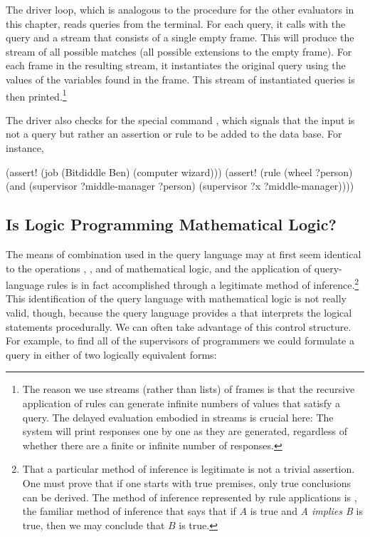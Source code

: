 The driver loop, which is analogous to the  procedure for the
other evaluators in this chapter, reads queries from the terminal.  For each
query, it calls  with the query and a stream that consists of a
single empty frame.  This will produce the stream of all possible matches (all
possible extensions to the empty frame).  For each frame in the resulting
stream, it instantiates the original query using the values of the variables
found in the frame.  This stream of instantiated queries is then
printed.\footnote{The reason we use streams (rather than lists) of frames is
that the recursive application of rules can generate infinite numbers of values
that satisfy a query.  The delayed evaluation embodied in streams is crucial
here: The system will print responses one by one as they are generated,
regardless of whether there are a finite or infinite number of responses.}

The driver also checks for the special command , which signals
that the input is not a query but rather an assertion or rule to be added to
the data base.  For instance,

\begin{codeBlock}
(assert! (job (Bitdiddle Ben)
              (computer wizard)))
(assert! (rule (wheel ?person)
               (and (supervisor ?middle-manager ?person)
                    (supervisor ?x ?middle-manager))))
\end{codeBlock}


\subsection{Is Logic Programming Mathematical Logic?}
\label{Section 4.4.3}

The means of combination used in the query language may at first seem identical
to the operations , , and  of mathematical logic,
and the application of query-language rules is in fact accomplished through a
legitimate method of inference.\footnote{That a particular method of inference
is legitimate is not a trivial assertion.  One must prove that if one starts
with true premises, only true conclusions can be derived.  The method of
inference represented by rule applications is , the
familiar method of inference that says that if \( A \) is true and \emph{A
implies B} is true, then we may conclude that \( B \) is true.} This
identification of the query language with mathematical logic is not really
valid, though, because the query language provides a  that interprets the logical statements procedurally.  We can often
take advantage of this control structure.  For example, to find all of the
supervisors of programmers we could formulate a query in either of two
logically equivalent forms:

